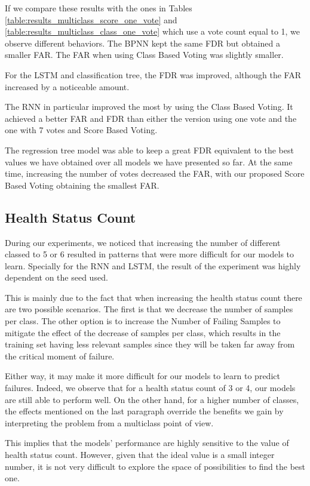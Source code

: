 If we compare these results with the ones in Tables \ref{table:results_multiclass_score_one_vote} and \ref{table:results_multiclass_class_one_vote} which use a vote count equal to 1, we observe different behaviors.
The BPNN kept the same FDR but obtained a smaller FAR.
The FAR when using Class Based Voting was slightly smaller.

For the LSTM and classification tree, the FDR was improved, although the FAR increased by a noticeable amount.

The RNN in particular improved the most by using the Class Based Voting.
It achieved a better FAR and FDR than either the version using one vote and the one with 7 votes and Score Based Voting.

The regression tree model was able to keep a great FDR equivalent to the best values we have obtained over all models we have presented so far.
At the same time, increasing the number of votes decreased the FAR, with our proposed Score Based Voting obtaining the smallest FAR.

\subsection{Health Status Count}

During our experiments, we noticed that increasing the number of different classed to 5 or 6 resulted in patterns that were more difficult for our models to learn.
Specially for the RNN and LSTM, the result of the experiment was highly dependent on the seed used.

This is mainly due to the fact that when increasing the health status count there are two possible scenarios.
The first is that we decrease the number of samples per class.
The other option is to increase the Number of Failing Samples to mitigate the effect of the decrease of samples per class, which results in the training set having less relevant samples since they will be taken far away from the critical moment of failure.

Either way, it may make it more difficult for our models to learn to predict failures.
Indeed, we observe that for a health status count of 3 or 4, our models are still able to perform well.
On the other hand, for a higher number of classes, the effects mentioned on the last paragraph override the benefits we gain by interpreting the problem from a multiclass point of view.

This implies that the models' performance are highly sensitive to the value of health status count.
However, given that the ideal value is a small integer number, it is not very difficult to explore the space of possibilities to find the best one.

